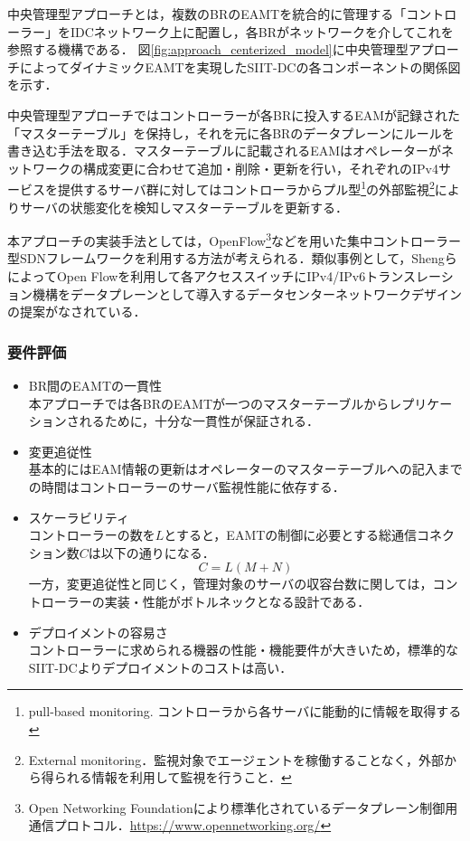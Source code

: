 中央管理型アプローチとは，複数のBRのEAMTを統合的に管理する「コントローラー」をIDCネットワーク上に配置し，各BRがネットワークを介してこれを参照する機構である．
図\ref{fig:approach_centerized_model}に中央管理型アプローチによってダイナミックEAMTを実現したSIIT-DCの各コンポーネントの関係図を示す．

中央管理型アプローチではコントローラーが各BRに投入するEAMが記録された「マスターテーブル」を保持し，それを元に各BRのデータプレーンにルールを書き込む手法を取る．マスターテーブルに記載されるEAMはオペレーターがネットワークの構成変更に合わせて追加・削除・更新を行い，それぞれのIPv4サービスを提供するサーバ群に対してはコントローラからプル型\footnote{pull-based monitoring. コントローラから各サーバに能動的に情報を取得する}の外部監視\footnote{External monitoring．監視対象でエージェントを稼働することなく，外部から得られる情報を利用して監視を行うこと．}によりサーバの状態変化を検知しマスターテーブルを更新する．

本アプローチの実装手法としては，OpenFlow\footnote{Open Networking Foundationにより標準化されているデータプレーン制御用通信プロトコル．\url{https://www.opennetworking.org/}}などを用いた集中コントローラー型SDNフレームワークを利用する方法が考えられる\cite{RFC7426}．類似事例として，ShengらによってOpen Flowを利用して各アクセススイッチにIPv4/IPv6トランスレーション機構をデータプレーンとして導入するデータセンターネットワークデザインの提案がなされている\cite{7560347}．


\subsubsection{要件評価}

\begin{itemize}
    \item BR間のEAMTの一貫性 \\
    本アプローチでは各BRのEAMTが一つのマスターテーブルからレプリケーションされるために，十分な一貫性が保証される．
    \item 変更追従性 \\
    基本的にはEAM情報の更新はオペレーターのマスターテーブルへの記入までの時間はコントローラーのサーバ監視性能に依存する．
    \item スケーラビリティ　\\
    コントローラーの数を$L$とすると，EAMTの制御に必要とする総通信コネクション数$C$は以下の通りになる．
    \begin{equation}
        C = L(M + N)
    \end{equation}
    一方，変更追従性と同じく，管理対象のサーバの収容台数に関しては，コントローラーの実装・性能がボトルネックとなる設計である．
    \item デプロイメントの容易さ　\\
    コントローラーに求められる機器の性能・機能要件が大きいため，標準的なSIIT-DCよりデプロイメントのコストは高い．

\end{itemize}



